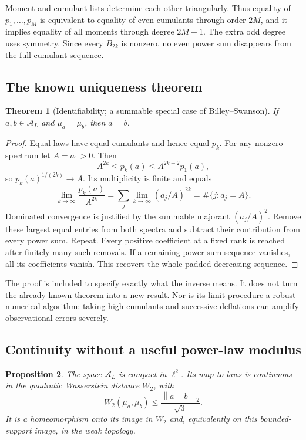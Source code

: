 \documentclass[11pt,a4paper]{article}
\newtheorem{theorem}{Theorem}[section]
\newtheorem{proposition}[theorem]{Proposition}
\theoremstyle{definition}
\theoremstyle{remark}
\newcommand{\A}{\mathcal A}
\newcommand{\norm}[1]{\left\lVert #1\right\rVert}
\begin{document}
Moment and cumulant lists determine each other triangularly. Thus equality
of $p_1,\ldots,p_M$ is equivalent to equality of even cumulants through
order $2M$, and it implies equality of all moments through degree $2M+1$.
The extra odd degree uses symmetry. Since every $B_{2k}$ is nonzero, no
even power sum disappears from the full cumulant sequence.

\subsection{The known uniqueness theorem}

\begin{theorem}[Identifiability; a summable special case of Billey--Swanson]
\label{thm:unique}
If $a,b\in\A_L$ and $\mu_a=\mu_b$, then $a=b$.
\end{theorem}

\begin{proof}
Equal laws have equal cumulants and hence equal $p_k$. For any nonzero
spectrum let $A=a_1>0$. Then
\[
 A^{2k}\le p_k(a)\le A^{2k-2}p_1(a),
\]
so $p_k(a)^{1/(2k)}\to A$. Its multiplicity is finite and equals
\[
 \lim_{k\to\infty}\frac{p_k(a)}{A^{2k}}
 =\sum_j\lim_{k\to\infty}(a_j/A)^{2k}
 =\#\{j:a_j=A\}.
\]
Dominated convergence is justified by the summable majorant $(a_j/A)^2$.
Remove these largest equal entries from both spectra and subtract their
contribution from every power sum. Repeat. Every positive coefficient at a
fixed rank is reached after finitely many such removals. If a remaining
power-sum sequence vanishes, all its coefficients vanish. This recovers the
whole padded decreasing sequence.
\end{proof}

The proof is included to specify exactly what the inverse means.
It does not turn the already known theorem into a new result. Nor is its
limit procedure a robust numerical algorithm: taking high cumulants and
successive deflations can amplify observational errors severely.

\subsection{Continuity without a useful power-law modulus}

\begin{proposition}\label{prop:compact}
The space $\A_L$ is compact in $\ell^2$. Its map to laws is continuous in
the quadratic Wasserstein distance $W_2$, with
\begin{equation}\label{eq:forward-w2}
 W_2(\mu_a,\mu_b)\le\frac{\norm{a-b}_2}{\sqrt3}.
\end{equation}
It is a homeomorphism onto its image in $W_2$ and, equivalently on this
bounded-support image, in the weak topology.
\end{proposition}
\end{document}
